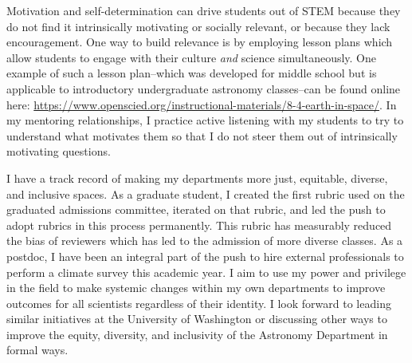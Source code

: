 \documentclass[11pt]{article}
\begin{document}
Motivation and self-determination can drive students out of STEM because they do not find it intrinsically motivating or socially relevant, or because they lack encouragement.
One way to build relevance is by employing lesson plans which allow students to engage with their culture \emph{and} science simultaneously.
One example of such a lesson plan--which was developed for middle school but is applicable to introductory undergraduate astronomy classes--can be found online here: \url{https://www.openscied.org/instructional-materials/8-4-earth-in-space/}.
In my mentoring relationships, I practice active listening \citep{jahromi_etal_2016} with my students to try to understand what motivates them so that I do not steer them out of intrinsically motivating questions.

I have a track record of making my departments more just, equitable, diverse, and inclusive spaces.
As a graduate student, I created the first rubric used on the graduated admissions committee, iterated on that rubric, and led the push to adopt rubrics in this process permanently.
This rubric has measurably reduced the bias of reviewers which has led to the admission of more diverse classes.
As a postdoc, I have been an integral part of the push to hire external professionals to perform a climate survey this academic year.
I aim to use my power and privilege in the field to make systemic changes within my own departments to improve outcomes for all scientists regardless of their identity.
I look forward to leading similar initiatives at the University of Washington or discussing other ways to improve the equity, diversity, and inclusivity of the Astronomy Department in formal ways.
\end{document}
